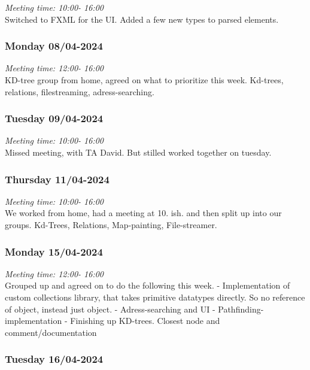 \emph{Meeting time: 10:00- 16:00 }\\
Switched to FXML for the UI. Added a few new types to parsed elements.

\hypertarget{monday-0804-2024}{%
\subsubsection*{Monday 08/04-2024}\label{monday-0804-2024}}

\emph{Meeting time: 12:00- 16:00 }\\
KD-tree group from home, agreed on what to prioritize this week.
Kd-trees, relations, filestreaming, adress-searching.

\hypertarget{tuesday-0904-2024}{%
\subsubsection*{Tuesday 09/04-2024}\label{tuesday-0904-2024}}

\emph{Meeting time: 10:00- 16:00 }\\
Missed meeting, with TA David. But stilled worked together on tuesday.

\hypertarget{thursday-1104-2024}{%
\subsubsection*{Thursday 11/04-2024}\label{thursday-1104-2024}}

\emph{Meeting time: 10:00- 16:00 }\\
We worked from home, had a meeting at 10. ish. and then split up into
our groups. Kd-Trees, Relations, Map-painting, File-streamer.

\hypertarget{monday-1504-2024}{%
\subsubsection*{Monday 15/04-2024}\label{monday-1504-2024}}

\emph{Meeting time: 12:00- 16:00 }\\
Grouped up and agreed on to do the following this week. - Implementation
of custom collections library, that takes primitive datatypes directly.
So no reference of object, instead just object. - Adress-searching and
UI - Pathfinding-implementation - Finishing up KD-trees. Closest node
and comment/documentation

\hypertarget{tuesday-1604-2024}{%
\subsubsection*{Tuesday 16/04-2024}\label{tuesday-1604-2024}}

